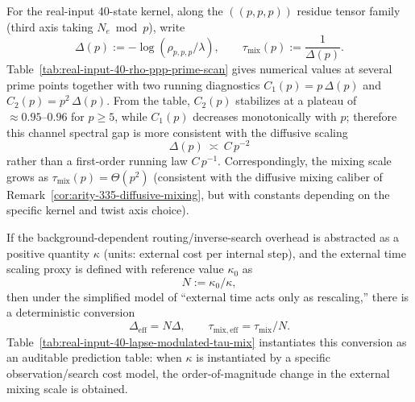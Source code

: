 \begin{remark}\label{rem:real-input-40-gap-diffusive-running}
For the real-input 40-state kernel, along the \(((p,p,p))\) residue tensor family (third axis taking \(N_e\bmod p\)), write
\[
\Delta(p):=-\log(\rho_{p,p,p}/\lambda),\qquad
\tau_{\mathrm{mix}}(p):=\frac{1}{\Delta(p)}.
\]
Table~\ref{tab:real-input-40-rho-ppp-prime-scan} gives numerical values at several prime points together with two running diagnostics
\(
C_1(p)=p\,\Delta(p)
\)
and
\(
C_2(p)=p^2\,\Delta(p)
\).
From the table, \(C_2(p)\) stabilizes at a plateau of \(\approx 0.95\text{--}0.96\) for \(p\ge 5\), while \(C_1(p)\) decreases monotonically with \(p\);
therefore this channel spectral gap is more consistent with the diffusive scaling
\[
\Delta(p)\ \asymp\ C\,p^{-2}
\]
rather than a first-order running law \(C\,p^{-1}\).
Correspondingly, the mixing scale grows as \(\tau_{\mathrm{mix}}(p)=\Theta(p^2)\) (consistent with the diffusive mixing caliber of Remark~\ref{cor:arity-335-diffusive-mixing}, but with constants depending on the specific kernel and twist axis choice).
\end{remark}


\begin{remark}\label{rem:lapse-modulated-tau-mix}
If the background-dependent routing/inverse-search overhead is abstracted as a positive quantity \(\kappa\) (units: external cost per internal step), and the external time scaling proxy is defined with reference value \(\kappa_0\) as
\[
N:=\kappa_0/\kappa,
\]
then under the simplified model of ``external time acts only as rescaling,'' there is a deterministic conversion
\[
\Delta_{\mathrm{eff}}=N\Delta,\qquad
\tau_{\mathrm{mix,eff}}=\tau_{\mathrm{mix}}/N.
\]
Table~\ref{tab:real-input-40-lapse-modulated-tau-mix} instantiates this conversion as an auditable prediction table: when \(\kappa\) is instantiated by a specific observation/search cost model, the order-of-magnitude change in the external mixing scale is obtained.
\end{remark}

